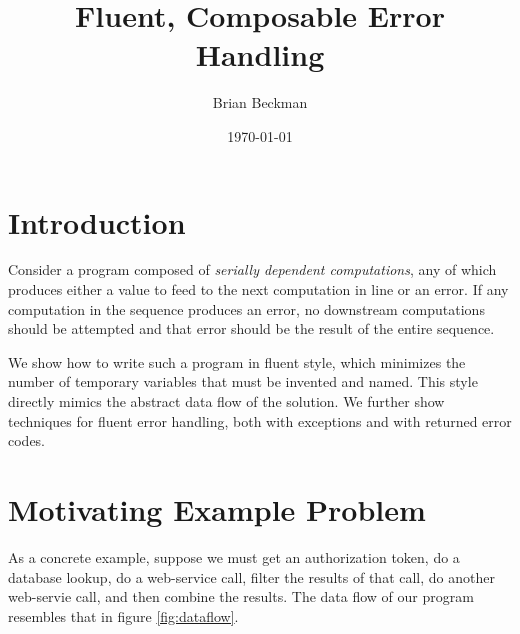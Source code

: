 \documentclass[11pt]{article}
\author{Brian Beckman}
\date{\today}
\title{Fluent, Composable Error Handling}
\begin{document}
\maketitle
\tableofcontents


\section{Introduction}
\label{sec-1}

Consider a program composed of \emph{serially dependent computations},
any of which produces either a value to feed to the next computation
in line or an error. If any computation in the sequence produces an
error, no downstream computations should be attempted and that error
should be the result of the entire sequence.

We show how to write such a program in fluent style, which
minimizes the number of temporary variables that must be invented
and named. This style directly mimics the abstract data flow of the
solution. We further show techniques for fluent error handling,
both with exceptions and with returned error codes.
\section{Motivating Example Problem}
\label{sec-2}

As a concrete example, suppose we must
get an authorization token, do a database lookup, do a web-service
call, filter the results of that call, do another web-servie call,
and then combine the results. The data flow of our program
resembles that in figure \ref{fig:dataflow}.
\end{document}
